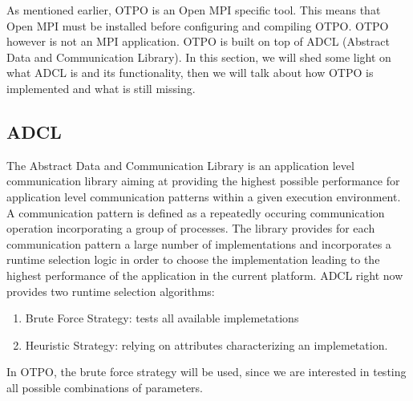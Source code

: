As mentioned earlier, OTPO is an Open MPI specific tool. This means that Open
MPI must be installed before configuring and compiling OTPO. OTPO however is
not an MPI application. OTPO is built on top of ADCL \cite{ADCL} (Abstract
Data and Communication Library). In this section, we will shed some light on
what ADCL is and its functionality, then we will talk about how OTPO is
implemented and what is still missing.

\subsection{ADCL}
The Abstract Data and Communication Library is an application level
communication library aiming at providing the highest possible performance for
application level communication patterns within a given execution
environment. A communication pattern is defined as a repeatedly occuring
communication operation incorporating a group of processes. The library
provides for each communication pattern a large number of implementations and
incorporates a runtime selection logic in order to choose the implementation
leading to the highest performance of the application in the current
platform. ADCL right now provides two runtime selection algorithms:
\begin{enumerate}
\item Brute Force Strategy: tests all available implemetations
\item Heuristic Strategy: relying on attributes characterizing an
  implemetation.
\end{enumerate}
In OTPO, the brute force strategy will be used, since we are interested in
testing all possible combinations of parameters.


